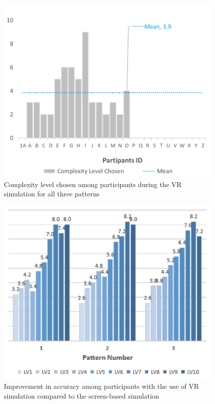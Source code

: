     \begin{figure}[htb]
        \centering
        \includegraphics[width=\linewidth]{Images/ComplexityLevelChosenChart}
        \caption{Complexity level chosen among participants during the VR simulation for all three patterns}
        \label{fig:ComplexityLevelChosenChart}
    \end{figure}


    \begin{figure}[htb]
        \centering
        \includegraphics[width=\linewidth]{Images/ComplexityPerceptionChart}
        \caption{Improvement in accuracy among participants with the use of VR simulation compared to the screen-based simulation}
        \label{fig:ComplexityPerceptionChart}
    \end{figure}

